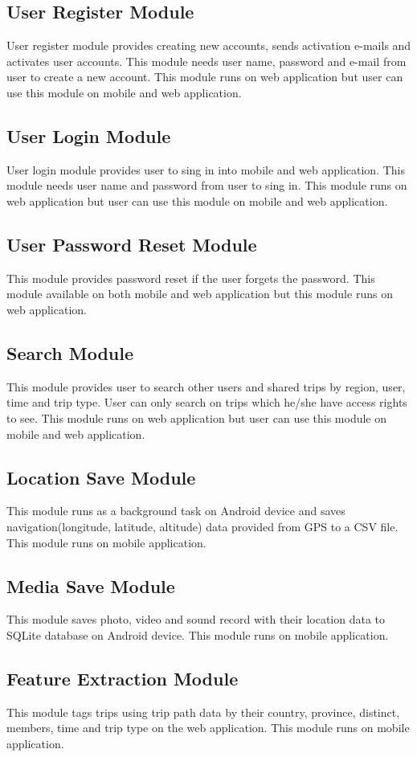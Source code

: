\subsection{User Register Module}
User register module provides creating new accounts, sends activation e-mails and activates user accounts. This module needs user name, password and e-mail from user to create a new account. This module runs on web application but user can use this module on mobile and web application.
\subsection{User Login Module}
User login module provides user to sing in into mobile and web application. This module needs user name and password from user to sing in. This module runs on web application but user can use this module on mobile and web application.
\subsection{User Password Reset Module}
This module provides password reset if the user forgets the password. This module available on both mobile and web application but this module runs on web application.
\subsection{Search Module}
This module provides user to search other users and shared trips by region, user, time and trip type. User can only search on trips which he/she have access rights to see. This module runs on web application but user can use this module on mobile and web application. 
\subsection{Location Save Module}
This module runs as a background task on Android device and saves navigation(longitude, latitude, altitude) data provided from GPS to a CSV file. This module runs on mobile application.
\subsection{Media Save Module}
This module saves photo, video and sound record with their location data to SQLite database on Android device. This module runs on mobile application.
\subsection{Feature Extraction Module}
This module tags trips using trip path data by their country, province, distinct, members, time and trip type on the web application. This module runs on mobile application.
